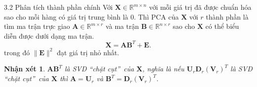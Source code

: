 \documentclass[notheorems,envcountsect,hyperref=unicode]{beamer}
\newtheorem{nx}{Nhận xét}[section]
\newcommand{\R}{\mathbb R}
\newcommand{\Q}{\mathbb Q}
\def\A{\mathcal{A}}
\def\R{\mathbb{R}}
\def\Q{\mathbb{Q}}
\def\L{\mathcal{L}}
\def\m{\mu}
\begin{document}
\begin{frame}{3.2 Phân tích thành phần chính}
Với $\mathbf{X} \in \mathbb{R}^{m \times n}$ với mỗi giá trị đã được chuẩn hóa sao cho mỗi hàng có giá trị trung bình là 0. Thì PCA của $\mathbf{X}$ với $r$ thành phần là tìm ma trận trực giao $\mathbf{A} \in \mathbb{R}^{m \times r}$ và ma trận $\mathbf{B} \in \mathbb{R}^{n \times r}$ sao cho $\mathbf{X}$ có thể biểu diễn được dưới dạng ma trận.
$$
\mathbf{X}=\mathbf{A} \mathbf{B}^{T}+\mathbf{E}.
$$
trong đó $\|\mathbf{E}\|^{2}$ đạt giá trị nhỏ nhất.
\begin{nx}
 $\mathbf{A} \mathbf{B}^{T}$ là SVD \textquotedblleft chặt cụt\textquotedblright\ của $\mathbf{X}$, nghĩa là nếu $\mathbf{U}_{r} \mathbf{D}_{r}\left(\mathbf{V}_{r}\right)^{T}$ là SVD \textquotedblleft chặt cụt\textquotedblright\   của $\mathbf{X}$ thì $\mathbf{A}= \mathbf{U}_{r}$ và $\mathbf{B}^{T}= \mathbf{D}_{r}\left(\mathbf{V}_{r}\right)^{T}$.
\end{nx}
\end{frame}

\end{document}
